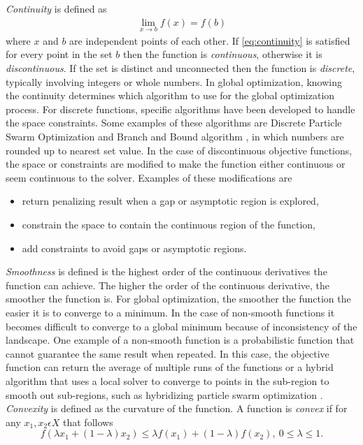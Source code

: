 \textit{Continuity} is defined as  
\begin{align}
  \label{eq:continuity}
  \lim_{x\rightarrow b} f(x) = f(b)
\end{align}
where $x$ and $b$ are independent points of each other. If \eqref{eq:continuity} is satisfied for every point in the set $b$ then the function is \textit{continuous}, otherwise it is \textit{discontinuous}. If the set is distinct and unconnected then the function is \textit{discrete}, typically involving integers or whole numbers. In global optimization, knowing the continuity determines which algorithm to use for the global optimization process. For discrete functions,
specific algorithms have been developed to handle the space constraints. Some examples of these algorithms are Discrete Particle Swarm Optimization \cite{Kaveh2014} and Branch and Bound algorithm \cite{Liberti2000}, in which numbers are rounded up to nearest set value. In the case of discontinuous objective functions, the space or constraints are modified to make the function either continuous or seem continuous to the solver. Examples of these modifications are
\begin{itemize}
    \item return penalizing result when a gap or asymptotic region is explored,
    \item constrain the space to contain the continuous region of the function,
    \item add constraints to avoid gaps or asymptotic regions.
\end{itemize}
\textit{Smoothness} is defined is the highest order of the continuous derivatives the function can achieve. The higher the order of the continuous derivative, the smoother the function is. For global optimization, the smoother the function the easier it is to converge to a minimum. In the case of non-smooth functions it becomes difficult to converge to a global minimum because of inconsistency of the landscape. One example of a non-smooth function is a probabilistic function that cannot guarantee the same result when repeated. In this case, the objective function can return the average of multiple runs of the functions or a hybrid algorithm that uses a local solver to converge to points in the sub-region to smooth out sub-regions, such as hybridizing particle swarm optimization \cite{Kaveh2014}.
\textit{Convexity} is defined as the curvature of the function. A function is \textit{convex} if for any $x_1,x_2 \epsilon X$ that follows
\begin{equation}
    \label{eq:convexity}
    f(\lambda x_1 + (1-\lambda)x_2) \leq \lambda f(x_1)+(1-\lambda)f(x_2),\ 0 \leq \lambda \leq 1.
\end{equation}

